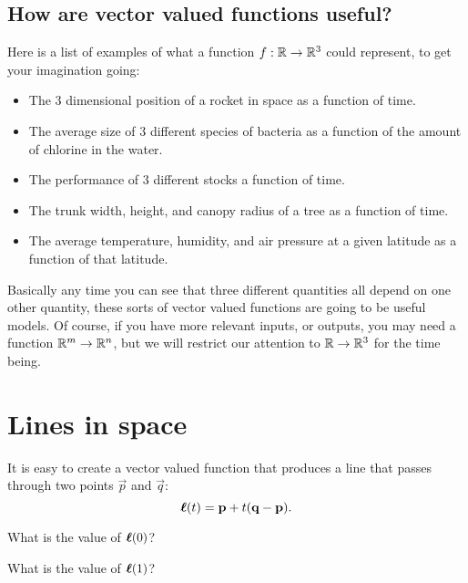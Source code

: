 \documentclass{ximera}
\begin{document}
\subsection{How are vector valued functions useful?}

Here is a list of examples of what a
function $f: \mathbb R \to \mathbb R^3$ could represent, to get your imagination
going:

\begin{itemize}
\item The $3$ dimensional position of a rocket in space as a function of time. 
\item The average size of $3$ different species of bacteria as a function of the amount of chlorine in the water.
\item The performance of $3$ different stocks a function of time.
\item The trunk width, height, and canopy radius of a tree as a function of time.
\item The average temperature, humidity, and air pressure at a given latitude as a function of that latitude.
\end{itemize}

Basically any time you can see that three different quantities all
depend on one other quantity, these sorts of vector valued functions
are going to be useful models.  Of course, if you have more relevant
inputs, or outputs, you may need a function $\mathbb R^m \to \mathbb R^n$, but we
will restrict our attention to $\mathbb R \to \mathbb R^3$ for the time being.



\section{Lines in space}

It is easy to create a vector valued function that produces a line
that passes through two points $\vec{p}$ and $\vec{q}$:
\[
\boldsymbol{\ell}(t) = \mathbf{p} + t(\mathbf{q}-\mathbf{p}).
\]
\begin{question}
  What is the value of $\boldsymbol{\ell}(0)$?
  \begin{multipleChoice}
  \end{multipleChoice}
  \begin{question}
    What is the value of $\boldsymbol{\ell}(1)$?
    \begin{multipleChoice}
    \end{multipleChoice}
  \end{question}
\end{question}
\end{document}
